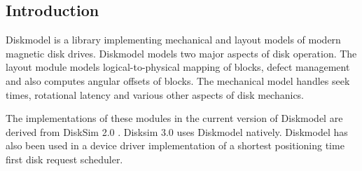 
\subsection{Introduction}
Diskmodel is a library implementing mechanical and layout models of
modern magnetic disk drives.  Diskmodel models two major aspects of disk
operation.  The layout module models logical-to-physical mapping of
blocks, defect management and also computes angular offsets of blocks.
The mechanical model handles seek times, rotational latency and
various other aspects of disk mechanics.

The implementations of these modules in the current version of
Diskmodel are derived from DiskSim 2.0 \cite{Ganger99}.  Disksim 3.0
uses Diskmodel natively. Diskmodel has also been used in a device
driver implementation of a shortest positioning time first disk
request scheduler.
